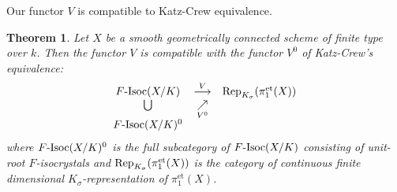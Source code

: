 \documentclass[11pt]{amsart}
\newtheorem{theorem}[Lemma]{Theorem}
\begin{document}
\vspace*{3mm}

Our functor $V$ is compatible to Katz-Crew equivalence. 

\begin{theorem}\label{crew} Let $X$ be a smooth geometrically connected scheme of finite type over $k$. 
Then the functor $V$ is compatible with the functor $V^0$ of Katz-Crew's equivalence: 
$$
     \begin{array}{ccc}
      F\mbox{\rm -Isoc}(X/K) &\overset{V}{\longrightarrow} &\mbox{\rm Rep}_{K_\sigma}(\pi_1^{\mathrm{et}}(X)) \\
            \bigcup&\underset{V^0}{\nearrow} & \\
           F\mbox{\rm -Isoc}(X/K)^0 
           \end{array}
$$
where $F\mbox{\rm -Isoc}(X/K)^0$ is the full subcategory of 
$F\mbox{\rm -Isoc}(X/K)$ consisting of unit-root $F$-isocrystals and 
$\mbox{\rm Rep}_{K_\sigma}(\pi_1^{\mathrm{et}}(X))$ is the category of 
continuous finite dimensional 
$K_\sigma$-representation of $\pi_1^{\mathrm{et}}(X)$.  
\end{theorem}
\end{document}
